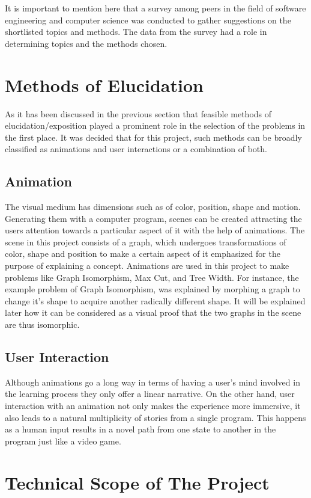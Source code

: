 It is important to mention here that a survey among
peers in the field of software engineering and computer science was conducted to 
gather suggestions on the shortlisted topics and methods.
The data from the survey had a role in determining topics and the methods chosen.


\section{Methods of Elucidation}
As it has been discussed in the previous section that feasible methods of
elucidation/exposition played a prominent role in the selection of the problems
in the first place. It was decided that for this project, such methods can be
broadly classified as animations and user interactions or a combination of
both.


\subsection{Animation}
The visual medium has dimensions such as of color, position, shape and motion.
Generating them with a computer program, scenes can be created attracting the
users attention towards a particular aspect of it with the help of animations.
The scene in this project consists of a graph, which undergoes transformations
of color, shape and position to make a certain aspect of it emphasized for the
purpose of explaining a concept.  Animations are used in this project to make
problems like Graph Isomorphism, Max Cut, and Tree Width. For instance, the
example problem of Graph Isomorphism, was explained by morphing a graph to change
it's shape to acquire another radically different shape. It will be explained
later how it can be considered as a visual proof that the two graphs in the
scene are thus isomorphic.

\subsection{User Interaction}
Although animations go a long way in terms of having a user's mind involved in
the learning process they only offer a linear narrative. On the other hand,
user interaction with an animation not only makes the experience more
immersive, it also leads to a natural multiplicity of stories from a single
program. This happens as a human input results in a novel path from one state to
another in the program just like a video game.

\section{Technical Scope of The Project}

